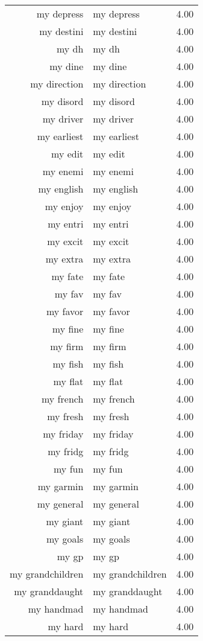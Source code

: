 \begin{table}[ht]
\begin{tabular}{rlr}
  my depress & my depress & 4.00 \\ 
  my destini & my destini & 4.00 \\ 
  my dh & my dh & 4.00 \\ 
  my dine & my dine & 4.00 \\ 
  my direction & my direction & 4.00 \\ 
  my disord & my disord & 4.00 \\ 
  my driver & my driver & 4.00 \\ 
  my earliest & my earliest & 4.00 \\ 
  my edit & my edit & 4.00 \\ 
  my enemi & my enemi & 4.00 \\ 
  my english & my english & 4.00 \\ 
  my enjoy & my enjoy & 4.00 \\ 
  my entri & my entri & 4.00 \\ 
  my excit & my excit & 4.00 \\ 
  my extra & my extra & 4.00 \\ 
  my fate & my fate & 4.00 \\ 
  my fav & my fav & 4.00 \\ 
  my favor & my favor & 4.00 \\ 
  my fine & my fine & 4.00 \\ 
  my firm & my firm & 4.00 \\ 
  my fish & my fish & 4.00 \\ 
  my flat & my flat & 4.00 \\ 
  my french & my french & 4.00 \\ 
  my fresh & my fresh & 4.00 \\ 
  my friday & my friday & 4.00 \\ 
  my fridg & my fridg & 4.00 \\ 
  my fun & my fun & 4.00 \\ 
  my garmin & my garmin & 4.00 \\ 
  my general & my general & 4.00 \\ 
  my giant & my giant & 4.00 \\ 
  my goals & my goals & 4.00 \\ 
  my gp & my gp & 4.00 \\ 
  my grandchildren & my grandchildren & 4.00 \\ 
  my granddaught & my granddaught & 4.00 \\ 
  my handmad & my handmad & 4.00 \\ 
  my hard & my hard & 4.00 \\ 

\end{tabular}
\end{table}
